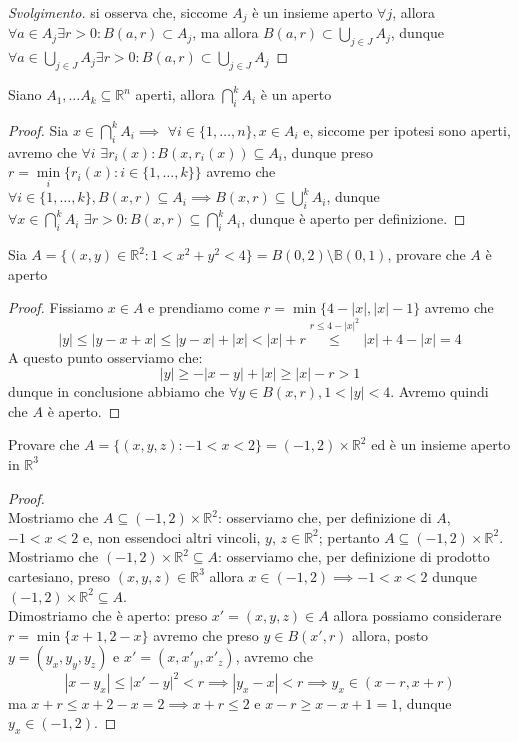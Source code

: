 \begin{proof}[Svolgimento]
si osserva che, siccome $A_j$ è un insieme aperto $\forall j$, allora $\forall a \in A_j \exists r > 0: B(a, r) \subset A_j$, ma allora $B(a, r) \subset \bigcup\limits_{j \in J} A_j$, dunque $\forall a \in \bigcup\limits_{j \in J} A_j \exists r > 0: B(a, r) \subset \bigcup\limits_{j \in J} A_j$
\end{proof}
\begin{exercise}
Siano $A_1, \ldots A_k \subseteq \mathbb{R}^n$ aperti, allora $\bigcap\limits_i^k A_i$ è un aperto
\end{exercise}
\begin{proof}
Sia $x \in \bigcap\limits_{i}^k A_i \implies \, \, \forall i \in \{1, \ldots, n \}, x \in A_i$ e, siccome per ipotesi sono aperti, avremo che $\forall i \, \, \exists r_i(x) : B(x, r_i(x)) \subseteq A_i$, dunque preso $r=\min\limits_i{ \{ r_i(x) : i \in \{1, \ldots, k \} \} }$ avremo che $\forall i \in \{1, \ldots, k \}, B(x, r) \subseteq A_i \implies B(x, r) \subseteq \bigcup\limits_i^k A_i$,
dunque $\forall x \in \bigcap\limits_{i}^k A_i \, \, \exists r > 0 : B(x, r) \subseteq \bigcap\limits_i^k A_i$, dunque è aperto per definizione.
\end{proof}
\begin{exercise}
Sia $A=\{(x, y) \in \mathbb{R}^2 : 1 < x^2 + y^2 < 4 \} = B(0, 2) \setminus \mathbb{B}(0,1)$, provare che $A$ è aperto
\end{exercise}
\begin{proof}
	Fissiamo $x \in A$ e prendiamo come $r=\min{ \{ 4-|x|, |x|-1 \} }$ avremo che
	$$
	|y| \leq |y-x+x| \leq |y-x| + |x| < |x| + r \stackrel{r \leq 4 - |x|^2}{\leq} |x| + 4 - |x| = 4
	$$
	A questo punto osserviamo che:
	$$
	|y| \geq -|x-y| + |x| \geq |x| - r > 1
	$$
	dunque in conclusione abbiamo che $\forall y \in B(x, r), 1 < |y| < 4$. Avremo quindi che $A$ è aperto.
\end{proof}
\begin{exercise}
Provare che $A = \{(x, y, z) : -1 < x < 2 \} = (-1, 2) \times \mathbb{R}^2$ ed è un insieme aperto in $\mathbb{R}^3$
\end{exercise}
\begin{proof} \hspace{1cm} \\
	Mostriamo che $A \subseteq (-1, 2) \times \mathbb{R}^2$: osserviamo che, per definizione di $A$, $-1<x<2$ e, non essendoci altri vincoli, $y$, $z \in \mathbb{R}^2$; pertanto $A \subseteq (-1, 2) \times \mathbb{R}^2$. \\
	Mostriamo che $(-1, 2) \times \mathbb{R}^2 \subseteq A$: osserviamo che, per definizione di prodotto cartesiano, preso $(x, y, z) \in \mathbb{R}^3$ allora $x \in (-1, 2) \implies -1 < x < 2$ dunque $(-1, 2) \times \mathbb{R}^2 \subseteq A$. \\
	Dimostriamo che è aperto: preso $x'=(x, y, z) \in A$ allora possiamo considerare $r = \min{ \{x+1, 2-x \} }$ avremo che preso $y \in B(x', r)$ allora, posto $y=(y_x, y_y, y_z)$ e $x'=(x, x'_y, x'_z)$, avremo che
	$$
	|x - y_x| \leq |x'-y|^2 < r \implies |y_x - x| < r \implies y_x \in (x - r, x + r) 
	$$
	ma $x + r \leq x + 2 - x = 2 \implies x + r \leq 2$ e $x - r \geq x - x + 1 = 1$, dunque $y_x \in (-1, 2)$.
\end{proof}
